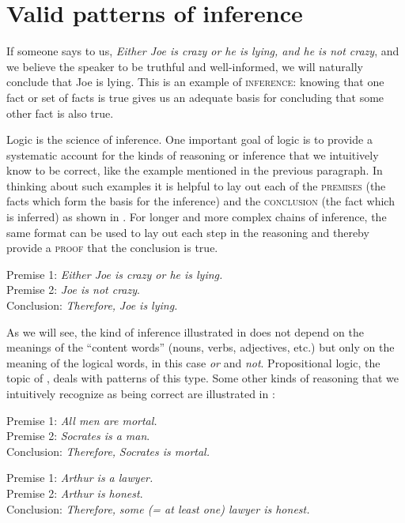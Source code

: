 \section{Valid patterns of inference}\label{sec:4.2}

If someone says to us, \textit{Either Joe is crazy or he is lying, and he is not crazy}, and we believe the speaker to be truthful and well-informed, we will naturally conclude that Joe is lying. This is an example of \textsc{inference}: knowing that one fact or set of facts is true gives us an adequate basis for concluding that some other fact is also true.



Logic is the science of inference. One important goal of logic is to provide a systematic account for the kinds of reasoning or inference that we intuitively know to be correct, like the example mentioned in the previous paragraph. In thinking about such examples it is helpful to lay out each of the \textsc{premises} (the facts which form the basis for the inference) and the \textsc{conclusion} (the fact which is inferred) as shown in . For longer and more complex chains of inference, the same format can be used to lay out each step in the reasoning and thereby provide a \textsc{proof} that the conclusion is true.


\ea \label{ex:4.1}
Premise 1: \textit{Either Joe is crazy or he is lying.}\\
Premise 2: \textit{Joe is not crazy}.\\
\FelixHRule
Conclusion: \textit{Therefore,} \textit{Joe is lying.}
\z


As we will see, the kind of inference illustrated in  does not depend on the meanings of the “content words” (nouns, verbs, adjectives, etc.) but only on the meaning of the logical words, in this case \textit{or} and \textit{not}. Propositional logic, the topic of , deals with patterns of this type. Some other kinds of reasoning that we intuitively recognize as being correct are illustrated in :


\ea \label{ex:4.2}
\ea  Premise 1: \textit{All men are mortal.}\\
Premise 2: \textit{Socrates is a man}.\\
\FelixHRule
Conclusion: \textit{Therefore,} \textit{Socrates is mortal.}
\medskip 

\ex Premise 1: \textit{Arthur is a lawyer.}\\
Premise 2: \textit{Arthur is honest}.\\
\FelixHRule
Conclusion: \textit{Therefore,} \textit{some (= at least one) lawyer is honest.}
                       \z
\z


